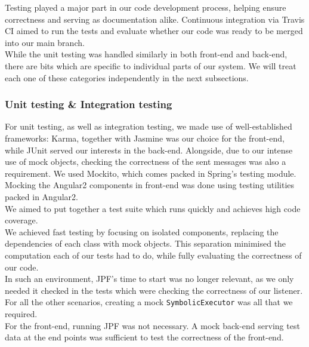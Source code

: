 \documentclass[titlepage,11pt]{article}
\begin{document}
Testing played a major part in our code development process, helping ensure correctness and serving as documentation alike. Continuous integration via Travis CI aimed to run the tests and evaluate whether our code was ready to be merged into our main branch. \\

\noindent While the unit testing was handled similarly in both front-end and back-end, there are bits which are specific to individual parts of our system. We will treat each one of these categories independently in the next subsections.

\subsubsection{Unit testing \& Integration testing}

\noindent For unit testing, as well as integration testing, we made use of well-established frameworks: Karma\cite{karma}, together with Jasmine\cite{jasmine} was our choice for the front-end, while JUnit \cite{junit} served our interests in the back-end. Alongside, due to our intense use of mock objects, checking the correctness of the sent messages was also a requirement. We used Mockito\cite{mockito}, which comes packed in Spring's testing module. Mocking the Angular2 components in front-end was done using testing utilities packed in Angular2. \\

\noindent We aimed to put together a test suite which runs quickly and achieves high code coverage. \\

\noindent We achieved fast testing by focusing on isolated components, replacing the dependencies of each class with mock objects. This separation minimised the computation each of our tests had to do, while fully evaluating the correctness of our code. \\

\noindent In such an environment, JPF's time to start was no longer relevant, as we only needed it checked in the tests which were checking the correctness of our listener. For all the other scenarios, creating a mock \texttt{SymbolicExecutor} was all that we required. \\

\noindent For the front-end, running JPF was not necessary. A mock back-end serving test data at the end points was sufficient to test the correctness of the front-end. \\ 
\end{document}
